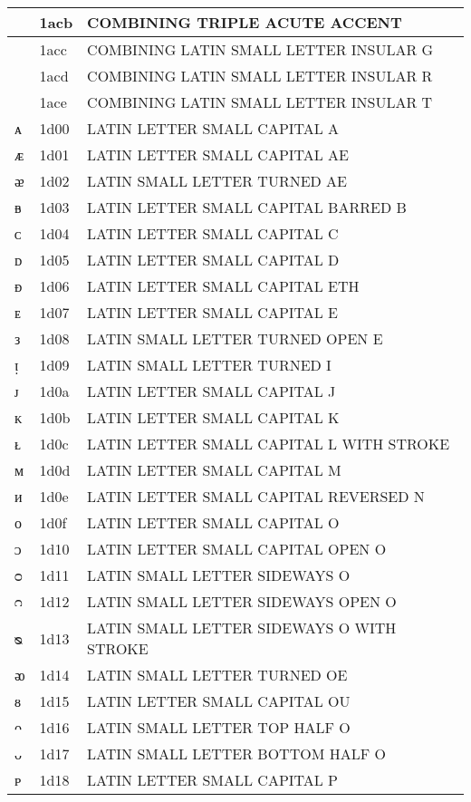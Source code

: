 \documentclass[12pt,letterpaper,openany]{book}
\begin{document}
\begin{center}
\begin{supertabular}{|m{0.25in}|m{0.5in}|m{4in}|}
◌᫋ & 1acb & COMBINING TRIPLE ACUTE ACCENT\\\hline
◌ᫌ & 1acc & COMBINING LATIN SMALL LETTER INSULAR G\\\hline
◌ᫍ & 1acd & COMBINING LATIN SMALL LETTER INSULAR R\\\hline
◌ᫎ & 1ace & COMBINING LATIN SMALL LETTER INSULAR T\\\hline
ᴀ & 1d00 & LATIN LETTER SMALL CAPITAL A\\\hline
ᴁ & 1d01 & LATIN LETTER SMALL CAPITAL AE\\\hline
ᴂ & 1d02 & LATIN SMALL LETTER TURNED AE\\\hline
ᴃ & 1d03 & LATIN LETTER SMALL CAPITAL BARRED B\\\hline
ᴄ & 1d04 & LATIN LETTER SMALL CAPITAL C\\\hline
ᴅ & 1d05 & LATIN LETTER SMALL CAPITAL D\\\hline
ᴆ & 1d06 & LATIN LETTER SMALL CAPITAL ETH\\\hline
ᴇ & 1d07 & LATIN LETTER SMALL CAPITAL E\\\hline
ᴈ & 1d08 & LATIN SMALL LETTER TURNED OPEN E\\\hline
ᴉ & 1d09 & LATIN SMALL LETTER TURNED I\\\hline
ᴊ & 1d0a & LATIN LETTER SMALL CAPITAL J\\\hline
ᴋ & 1d0b & LATIN LETTER SMALL CAPITAL K\\\hline
ᴌ & 1d0c & LATIN LETTER SMALL CAPITAL L WITH STROKE\\\hline
ᴍ & 1d0d & LATIN LETTER SMALL CAPITAL M\\\hline
ᴎ & 1d0e & LATIN LETTER SMALL CAPITAL REVERSED N\\\hline
ᴏ & 1d0f & LATIN LETTER SMALL CAPITAL O\\\hline
ᴐ & 1d10 & LATIN LETTER SMALL CAPITAL OPEN O\\\hline
ᴑ & 1d11 & LATIN SMALL LETTER SIDEWAYS O\\\hline
ᴒ & 1d12 & LATIN SMALL LETTER SIDEWAYS OPEN O\\\hline
ᴓ & 1d13 & LATIN SMALL LETTER SIDEWAYS O WITH STROKE\\\hline
ᴔ & 1d14 & LATIN SMALL LETTER TURNED OE\\\hline
ᴕ & 1d15 & LATIN LETTER SMALL CAPITAL OU\\\hline
ᴖ & 1d16 & LATIN SMALL LETTER TOP HALF O\\\hline
ᴗ & 1d17 & LATIN SMALL LETTER BOTTOM HALF O\\\hline
ᴘ & 1d18 & LATIN LETTER SMALL CAPITAL P\\\hline

\end{supertabular}
\end{center}
\end{document}
